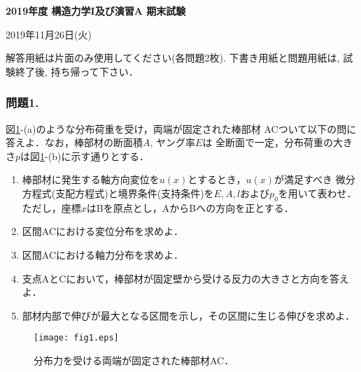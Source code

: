 \documentclass[10pt,a4j]{jarticle}
\newlength{\minitwocolumn}
\begin{document}
\newcommand{\fat}[1]{\mbox{\boldmath $#1$}}
\newcommand{\D}{\partial}
\newcommand{\w}{\omega}
\newcommand{\ga}{\alpha}
\newcommand{\gb}{\beta}
\newcommand{\gx}{\xi}
\newcommand{\gz}{\zeta}
\newcommand{\vhat}[1]{\hat{\fat{#1}}}
\newcommand{\spc}{\vspace{0.7\baselineskip}}
\newcommand{\halfspc}{\vspace{0.3\baselineskip}}

\newcommand{\twofig}[2]
 {
   \begin{figure}[here]
     \begin{minipage}[t]{\minitwocolumn}
         \begin{center}   #1
         \end{center}
     \end{minipage}
         \hspace{\columnsep}
     \begin{minipage}[t]{\minitwocolumn}
         \begin{center} #2
         \end{center}
     \end{minipage}
   \end{figure}
 }
\begin{center}
{\Large \bf 2019年度 構造力学I及び演習A 期末試験} \\
\end{center}
\begin{flushright}
	2019年11月26日(火)
\end{flushright}
解答用紙は片面のみ使用してください(各問題2枚). 
下書き用紙と問題用紙は, 試験終了後, 持ち帰って下さい．
%
%
%
\subsubsection*{問題1.}
図\ref{fig:fig1}-(a)のような分布荷重を受け，両端が固定された棒部材
ACついて以下の問に答えよ．なお，棒部材の断面積$A$, ヤング率$E$は
全断面で一定，分布荷重の大きさ$p$は図\ref{fig:fig1}-(b)に示す通りとする．
\begin{enumerate}
\item
	棒部材に発生する軸方向変位を$u(x)$とするとき，$u(x)$が満足すべき
	微分方程式(支配方程式)と境界条件(支持条件)を$E, A, l$および$p_0$を用いて表わせ．
	ただし，座標$x$はBを原点とし，AからBへの方向を正とする．
\item
	区間ACにおける変位分布を求めよ．
\item	
	区間ACにおける軸力分布を求めよ．
\item	
	支点AとCにおいて，棒部材が固定壁から受ける反力の大きさと方向を答えよ．
\item
	部材内部で伸びが最大となる区間を示し，その区間に生じる伸びを求めよ．
\end{enumerate}
\begin{figure}[h]
	\begin{center}
	\texttt{[image: fig1.eps]} 
	\end{center}
	\caption{分布力を受ける両端が固定された棒部材AC．}
	\label{fig:fig1}
\end{figure}
\newpage
\end{document}
